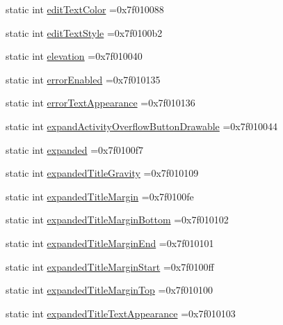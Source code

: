 \begin{DoxyCompactItemize}
\item 
static int \hyperlink{classandroid_1_1support_1_1v7_1_1cardview_1_1R_1_1attr_a59b88e30dbbfcf1116c696f3515f01ad}{edit\+Text\+Color} =0x7f010088
\item 
static int \hyperlink{classandroid_1_1support_1_1v7_1_1cardview_1_1R_1_1attr_a00e37547cae9047bd31b90ba0052d707}{edit\+Text\+Style} =0x7f0100b2
\item 
static int \hyperlink{classandroid_1_1support_1_1v7_1_1cardview_1_1R_1_1attr_af8da2ee4ea221f8d413747edbfbf8ccb}{elevation} =0x7f010040
\item 
static int \hyperlink{classandroid_1_1support_1_1v7_1_1cardview_1_1R_1_1attr_a5cf4a86d1951bf7c1f69873d84ffdc45}{error\+Enabled} =0x7f010135
\item 
static int \hyperlink{classandroid_1_1support_1_1v7_1_1cardview_1_1R_1_1attr_aa24f76b658731325f150e64ac38b5ce6}{error\+Text\+Appearance} =0x7f010136
\item 
static int \hyperlink{classandroid_1_1support_1_1v7_1_1cardview_1_1R_1_1attr_a8f85e7e29323492d9ca305428b27de38}{expand\+Activity\+Overflow\+Button\+Drawable} =0x7f010044
\item 
static int \hyperlink{classandroid_1_1support_1_1v7_1_1cardview_1_1R_1_1attr_a648bc14af4dface51acb88262207eebc}{expanded} =0x7f0100f7
\item 
static int \hyperlink{classandroid_1_1support_1_1v7_1_1cardview_1_1R_1_1attr_a068c1520150b812c70b2fb76a8fe73ae}{expanded\+Title\+Gravity} =0x7f010109
\item 
static int \hyperlink{classandroid_1_1support_1_1v7_1_1cardview_1_1R_1_1attr_aea6ee7452b54b5a08a1365f1d0948dc7}{expanded\+Title\+Margin} =0x7f0100fe
\item 
static int \hyperlink{classandroid_1_1support_1_1v7_1_1cardview_1_1R_1_1attr_a878bd32d2efa5f44c68c548991a7680b}{expanded\+Title\+Margin\+Bottom} =0x7f010102
\item 
static int \hyperlink{classandroid_1_1support_1_1v7_1_1cardview_1_1R_1_1attr_a10240d18a9a9b1a56ef4e7a06d966013}{expanded\+Title\+Margin\+End} =0x7f010101
\item 
static int \hyperlink{classandroid_1_1support_1_1v7_1_1cardview_1_1R_1_1attr_a962000eea280327317fca819ae6f778a}{expanded\+Title\+Margin\+Start} =0x7f0100ff
\item 
static int \hyperlink{classandroid_1_1support_1_1v7_1_1cardview_1_1R_1_1attr_af2ccc3d944b206dbd73961344a8925bd}{expanded\+Title\+Margin\+Top} =0x7f010100
\item 
static int \hyperlink{classandroid_1_1support_1_1v7_1_1cardview_1_1R_1_1attr_a584d2e618ca9dda1b87ba8c0f9a707ba}{expanded\+Title\+Text\+Appearance} =0x7f010103

\end{DoxyCompactItemize}
